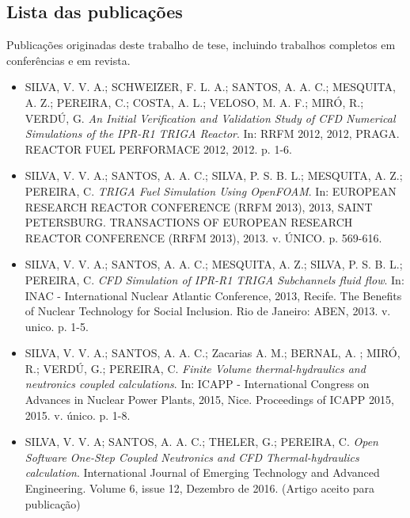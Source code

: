 \documentclass[12pt,openright,twoside,a4paper,english,french,spanish,brazil]{abntex2}
\begin{document}
\begin{anexosenv}

\partanexos

\chapter{Lista das publicações}

\label{ane}
%

Publicações originadas deste trabalho de tese, incluindo
trabalhos completos em conferências e em revista.

\begin{itemize}
\item SILVA, V. V. A.; SCHWEIZER, F. L. A.; SANTOS, A. A. C.; MESQUITA, A. Z.; PEREIRA, C.; COSTA, A. L.; VELOSO, M. A. F.; MIRÓ, R.; VERDÚ, G. \textit{An Initial Verification and Validation Study of CFD Numerical Simulations of the IPR-R1 TRIGA Reactor}. In: RRFM 2012, 2012, PRAGA. REACTOR FUEL PERFORMACE 2012, 2012. p. 1-6.

\item SILVA, V. V. A.; SANTOS, A. A. C.; SILVA, P. S. B. L.; MESQUITA, A. Z.; PEREIRA, C. \textit{TRIGA Fuel Simulation Using OpenFOAM}. In: EUROPEAN RESEARCH REACTOR CONFERENCE (RRFM 2013), 2013, SAINT PETERSBURG. TRANSACTIONS OF EUROPEAN RESEARCH REACTOR CONFERENCE (RRFM 2013), 2013. v. ÚNICO. p. 569-616.

\item SILVA, V. V. A.; SANTOS, A. A. C.; MESQUITA, A. Z.; SILVA, P. S. B. L.; PEREIRA, C. \textit{CFD Simulation of IPR-R1 TRIGA Subchannels fluid flow}. In: INAC - International Nuclear Atlantic Conference, 2013, Recife. The Benefits of Nuclear Technology for Social Inclusion. Rio de Janeiro: ABEN, 2013. v. unico. p. 1-5.

\item SILVA, V. V. A.; SANTOS, A. A. C.; Zacarias A. M.; BERNAL, A. ; MIRÓ, R.; VERDÚ, G.; PEREIRA, C. \textit{Finite Volume thermal-hydraulics and neutronics coupled calculations}. In: ICAPP - International Congress on Advances in Nuclear Power Plants, 2015, Nice. Proceedings of ICAPP 2015, 2015. v. único. p. 1-8.

\item SILVA, V. V. A; SANTOS, A. A. C.; THELER, G.; PEREIRA, C. \textit{Open Software One-Step Coupled Neutronics and CFD Thermal-hydraulics calculation}. International Journal of Emerging Technology and Advanced Engineering. Volume 6, issue 12, Dezembro de 2016. (Artigo aceito para publicação)
  

\end{itemize}
\end{anexosenv}
\end{document}
